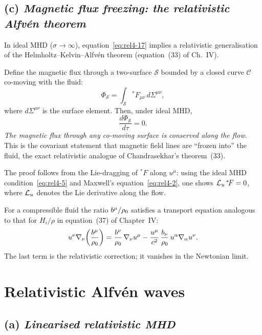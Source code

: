 \subsection*{(c) \emph{Magnetic flux freezing: the relativistic Alfv\'en theorem}}

In ideal MHD ($\sigma\to\infty$), equation~\eqref{eq:rel4-17} implies a
relativistic generalisation of the Helmholtz--Kelvin--Alfv\'en theorem
(equation~(33) of Ch.~IV).

Define the magnetic flux through a two-surface $\mathcal{S}$ bounded by a
closed curve $\mathcal{C}$ co-moving with the fluid:
\begin{equation}\label{eq:rel4-20}
  \Phi_{\mathcal{S}} = \int_{\mathcal{S}} {}^{*}\!F_{\mu\nu}\,d\Sigma^{\mu\nu},
\end{equation}
where $d\Sigma^{\mu\nu}$ is the surface element.  Then, under ideal MHD,
\begin{equation}\label{eq:rel4-21}
  \boxed{
  \frac{d\Phi_{\mathcal{S}}}{d\tau} = 0.
  }
\end{equation}
\emph{The magnetic flux through any co-moving surface is conserved along
the flow.}  This is the covariant statement that magnetic field lines are
``frozen into'' the fluid, the exact relativistic analogue of
Chandrasekhar's theorem~(33).

The proof follows from the Lie-dragging of ${}^{*}\!F$ along $u^{\mu}$:
using the ideal MHD condition~\eqref{eq:rel4-5} and Maxwell's
equation~\eqref{eq:rel4-2}, one shows $\mathcal{L}_{u}\,{}^{*}\!F=0$, where
$\mathcal{L}_{u}$ denotes the Lie derivative along the flow.

For a compressible fluid the ratio $b^{\mu}/\rho_0$ satisfies a
transport equation analogous to that for $H_{i}/\rho$ in
equation~(37) of Chapter~IV:
\begin{equation}\label{eq:rel4-22}
  u^{\nu}\nabla_{\nu}\!\left(\frac{b^{\mu}}{\rho_0}\right)
  = \frac{b^{\nu}}{\rho_0}\,\nabla_{\nu}u^{\mu}
    - \frac{u^{\mu}}{c^{2}}\,\frac{b_{\nu}}{\rho_0}\,
      u^{\alpha}\nabla_{\alpha}u^{\nu}.
\end{equation}
The last term is the relativistic correction; it vanishes in the Newtonian
limit.


\section{Relativistic Alfv\'en waves}\label{sec:rel39}

\subsection*{(a) \emph{Linearised relativistic MHD}}

